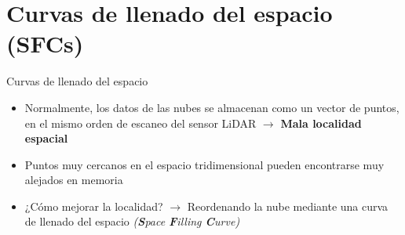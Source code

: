 \documentclass[aspectratio=169]{beamer}
\begin{document}
\section{Curvas de llenado del espacio (SFCs)}
\begin{frame}{Curvas de llenado del espacio}
    \begin{itemize}
        \item Normalmente, los datos de las nubes se almacenan como un vector de puntos, en el mismo orden de escaneo del sensor LiDAR $\rightarrow$ \textbf{Mala localidad espacial} 
        \item Puntos muy cercanos en el espacio tridimensional pueden encontrarse muy alejados en memoria
        \item ¿Cómo mejorar la localidad? $\rightarrow$ Reordenando la nube mediante una curva de llenado del espacio \textit{(\textbf{S}pace \textbf{F}illing \textbf{C}urve)} \cite{asano1997space}
    \end{itemize}
\end{frame}
\end{document}
